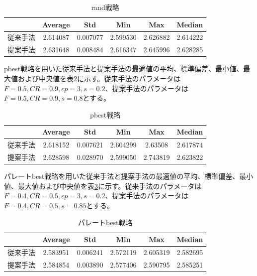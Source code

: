 \documentclass[a4paper,12pt]{jsreport}
\begin{document}
\begin{table}[htbp]
\begin{center}
\caption{rand戦略}
\label{tbl:rand}
\begin{tabular}{|c|c|c|c|c|c|}
\hline
      & Average & Std & Min & Max & Median  \\ \hline
従来手法 & 2.614087	& 0.007077 & 2.599530 & 2.626882 & 2.614222\\ \hline
提案手法 & 2.631648 & 0.008484 & 2.616347 & 2.645996 & 2.628285\\ \hline
\end{tabular}
\end{center}
\end{table}

pbest戦略を用いた従来手法と提案手法の最適値の平均、標準偏差、最小値、最大値および中央値を表\ref{tbl:pbest}に示す。従来手法のパラメータは$F=0.5,CR=0.9,cp=3,s=0.2$、提案手法のパラメータは$F=0.5,CR=0.9,s=0.8$とする。

\begin{table}[htbp]
\begin{center}
\caption{pbest戦略}
\label{tbl:pbest}
\begin{tabular}{|c|c|c|c|c|c|}
\hline
      & Average & Std & Min & Max & Median  \\ \hline
従来手法 & 2.618152	& 0.007621 & 2.604299 & 2.63508 & 2.617874\\ \hline
提案手法 & 2.628598 & 0.028970 & 2.599050 & 2.743819 & 2.623822\\ \hline
\end{tabular}
\end{center}
\end{table}

パレートbest戦略を用いた従来手法と提案手法の最適値の平均、標準偏差、最小値、最大値および中央値を表\ref{tbl:パレートbest}に示す。従来手法のパラメータは$F=0.4,CR=0.5,cp=3,s=0.2$、提案手法のパラメータは$F=0.4,CR=0.5,s=0.85$とする。

\begin{table}[htbp]
\begin{center}
\caption{パレートbest戦略}
\label{tbl:パレートbest}
\begin{tabular}{|c|c|c|c|c|c|}
\hline
      & Average & Std & Min & Max & Median  \\ \hline
従来手法 & 2.583951	& 0.006241 & 2.572119 & 2.605319 & 2.582695\\ \hline
提案手法 & 2.584854 & 0.003890 & 2.577406 & 2.590795 & 2.585251\\ \hline
\end{tabular}
\end{center}
\end{table}
\end{document}
